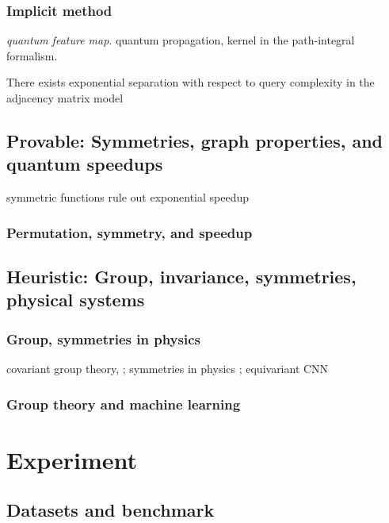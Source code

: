 \subsubsection{Implicit method}
\emph{quantum feature map}.
quantum propagation, kernel in the path-integral formalism.

\begin{theorem}
	There exists exponential separation with respect to query complexity in the adjacency matrix model
\end{theorem}
\cite{zhengSpeedingLearningQuantum2022}

\cite{liuRigorousRobustQuantum2021}

\subsection{Provable: Symmetries, graph properties, and quantum speedups}
symmetric functions rule out exponential speedup
\cite{ben-davidSymmetriesGraphProperties2020}
\subsubsection{Permutation, symmetry, and speedup}

\subsection{Heuristic: Group, invariance, symmetries, physical systems}
\subsubsection{Group, symmetries in physics}
covariant 
\cite{glickCovariantQuantumKernels2021}
group theory, 
\cite{kondorGroupTheoreticalMethods2008};
symmetries in physics
\cite{bogatskiyLorentzGroupEquivariant2020};
equivariant CNN 
\cite{zhengSpeedingLearningQuantum2022}

\subsubsection{Group theory and machine learning}
\cite{kondorDiffusionKernelsGraphs2002}

\section{Experiment}\label{sec:experiments}

\subsection{Datasets and benchmark}

